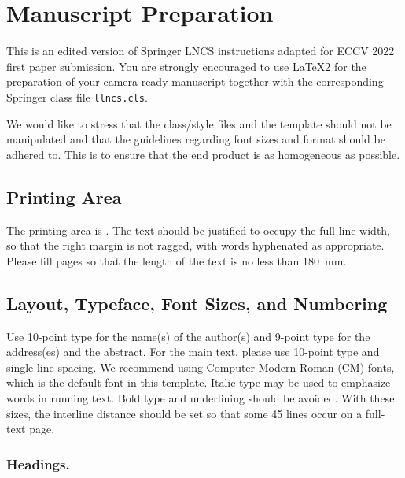 \documentclass[runningheads]{llncs}
\begin{document}
\section{Manuscript Preparation}

This is an edited version of Springer LNCS instructions adapted
for ECCV 2022 first paper submission.
You are strongly encouraged to use \LaTeX2 for the
preparation of your
camera-ready manuscript together with the corresponding Springer
class file \verb+llncs.cls+.

We would like to stress that the class/style files and the template
should not be manipulated and that the guidelines regarding font sizes
and format should be adhered to. This is to ensure that the end product
is as homogeneous as possible.

\subsection{Printing Area}
The printing area is .
The text should be justified to occupy the full line width,
so that the right margin is not ragged, with words hyphenated as
appropriate. Please fill pages so that the length of the text
is no less than 180~mm.

\subsection{Layout, Typeface, Font Sizes, and Numbering}
Use 10-point type for the name(s) of the author(s) and 9-point type for
the address(es) and the abstract. For the main text, please use 10-point
type and single-line spacing.
We recommend using Computer Modern Roman (CM) fonts, which is the default font in this template.
Italic type may be used to emphasize words in running text. Bold
type and underlining should be avoided.
With these sizes, the interline distance should be set so that some 45
lines occur on a full-text page.

\subsubsection{Headings.}
\end{document}
